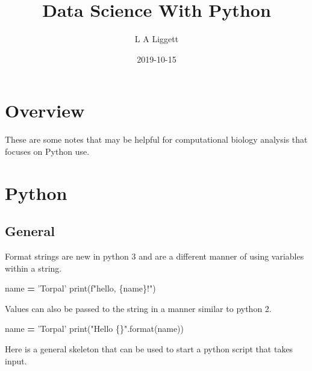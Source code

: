 \documentclass[]{book}
\title{Data Science With Python}
\author{L A Liggett}
\date{2019-10-15}
\newenvironment{Shaded}{\begin{snugshade}}{\end{snugshade}}
\newcommand{\SpecialCharTok}[1]{\textcolor[rgb]{0.00,0.00,0.00}{#1}}
\newcommand{\StringTok}[1]{\textcolor[rgb]{0.31,0.60,0.02}{#1}}
\newcommand{\SpecialStringTok}[1]{\textcolor[rgb]{0.31,0.60,0.02}{#1}}
\newcommand{\OperatorTok}[1]{\textcolor[rgb]{0.81,0.36,0.00}{\textbf{#1}}}
\newcommand{\BuiltInTok}[1]{#1}
\newcommand{\NormalTok}[1]{#1}
\begin{document}
\maketitle

{
\setcounter{tocdepth}{1}
\tableofcontents
}
\chapter{Overview}\label{overview}

These are some notes that may be helpful for computational biology
analysis that focuses on Python use.

\chapter{Python}\label{python}

\section{General}\label{general}

Format strings are new in python 3 and are a different manner of using
variables within a string.

\begin{Shaded}
\begin{Highlighting}[]
\NormalTok{name }\OperatorTok{=} \StringTok{'Torpal'}
\BuiltInTok{print}\NormalTok{(}\SpecialStringTok{f"hello, }\SpecialCharTok{\{}\NormalTok{name}\SpecialCharTok{\}}\SpecialStringTok{!"}\NormalTok{)}
\end{Highlighting}
\end{Shaded}

Values can also be passed to the string in a manner similar to python 2.

\begin{Shaded}
\begin{Highlighting}[]
\NormalTok{name }\OperatorTok{=} \StringTok{'Torpal'}
\BuiltInTok{print}\NormalTok{(}\StringTok{"Hello }\SpecialCharTok{\{\}}\StringTok{"}\NormalTok{.}\BuiltInTok{format}\NormalTok{(name))}
\end{Highlighting}
\end{Shaded}

Here is a general skeleton that can be used to start a python script
that takes input.
\end{document}
